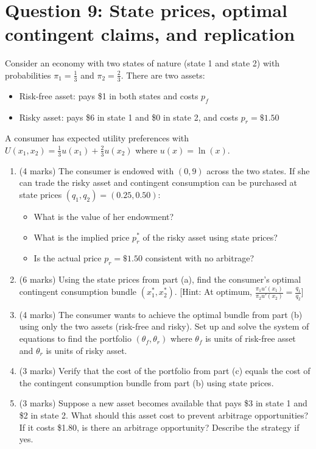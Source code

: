 \documentclass[12pt]{article}
\begin{document}
\newpage
\section*{Question 9: State prices, optimal contingent claims, and replication}

Consider an economy with two states of nature (state 1 and state 2) with probabilities $\pi_1 = \frac{1}{3}$ and $\pi_2 = \frac{2}{3}$. There are two assets:
\begin{itemize}
\item Risk-free asset: pays \$1 in both states and costs $p_f$
\item Risky asset: pays \$6 in state 1 and \$0 in state 2, and costs $p_r = \$1.50$
\end{itemize}

A consumer has expected utility preferences with $U(x_1, x_2) = \frac{1}{3}u(x_1) + \frac{2}{3}u(x_2)$ where $u(x) = \ln(x)$.

\begin{enumerate}[label=(\alph*)]
\item (4 marks) The consumer is endowed with $(0, 9)$ across the two states. If she can trade the risky asset and contingent consumption can be purchased at state prices $(q_1, q_2) = (0.25, 0.50)$:
\begin{itemize}
\item What is the value of her endowment?
\item What is the implied price $p_r^*$ of the risky asset using state prices?
\item Is the actual price $p_r = \$1.50$ consistent with no arbitrage?
\end{itemize}

\item (6 marks) Using the state prices from part (a), find the consumer's optimal contingent consumption bundle $(x_1^*, x_2^*)$. [Hint: At optimum, $\frac{\pi_1 u'(x_1)}{\pi_2 u'(x_2)} = \frac{q_1}{q_2}$]

\item (4 marks) The consumer wants to achieve the optimal bundle from part (b) using only the two assets (risk-free and risky). Set up and solve the system of equations to find the portfolio $(\theta_f, \theta_r)$ where $\theta_f$ is units of risk-free asset and $\theta_r$ is units of risky asset.

\item (3 marks) Verify that the cost of the portfolio from part (c) equals the cost of the contingent consumption bundle from part (b) using state prices.

\item (3 marks) Suppose a new asset becomes available that pays \$3 in state 1 and \$2 in state 2. What should this asset cost to prevent arbitrage opportunities? If it costs \$1.80, is there an arbitrage opportunity? Describe the strategy if yes.
\end{enumerate}
\end{document}
